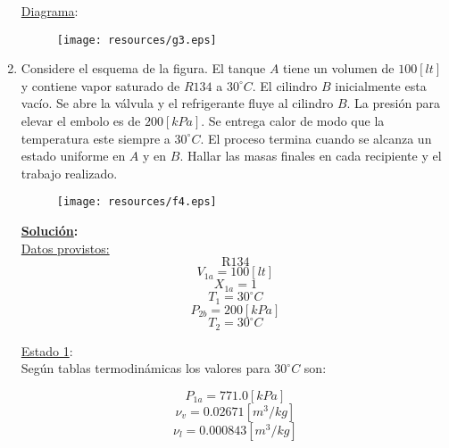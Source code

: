 \documentclass[letter,11pt]{article}
\begin{document}
\begin{enumerate}
\underline{Diagrama}:\\

\begin{figure}[!h]
\centering
\texttt{[image: resources/g3.eps]}
\end{figure}

\newpage

\item Considere el esquema de la figura. El tanque $A$ tiene un volumen de
$100[lt]$ y contiene vapor saturado de $R134$ a $30^\circ C$. El cilindro $B$
inicialmente esta vacío. Se abre la válvula y el refrigerante fluye al cilindro
$B$. La presión para elevar el embolo es de $200[kPa]$. Se entrega calor de modo
que la temperatura este siempre a $30^\circ C$. El proceso termina cuando se
alcanza un estado uniforme en $A$ y en $B$. Hallar las masas finales en cada
recipiente y el trabajo realizado.

\begin{figure}[!h]
\centering
\texttt{[image: resources/f4.eps]}
\end{figure}

\textbf{\underline{Solución}:} \\

\underline{Datos provistos:} \\

\begin{equation*}
    \text{R134}
\end{equation*}
\begin{equation*}
    V_{1a}=100[lt]
\end{equation*}
\begin{equation*}
    X_{1a}=1
\end{equation*}
\begin{equation*}
    T_1=30^\circ C
\end{equation*}
\begin{equation*}
    P_{2b}=200[kPa]
\end{equation*}
\begin{equation*}
    T_2=30^\circ C
\end{equation*}

\underline{Estado 1}:\\
Según tablas termodinámicas los valores para $30^\circ C$ son:

\begin{equation*}
    P_{1a}=771.0[kPa]
\end{equation*}
\begin{equation*}
    \nu_v=0.02671[m^3/kg]
\end{equation*}
\begin{equation*}
    \nu_l=0.000843[m^3/kg]
\end{equation*}


\end{enumerate}
\end{document}
